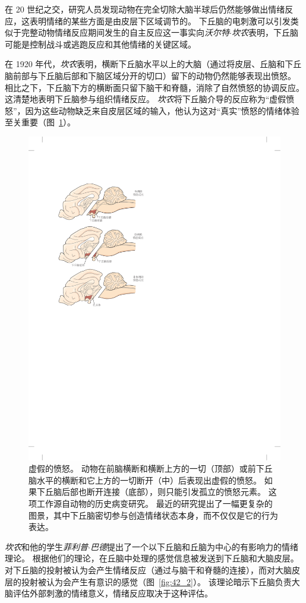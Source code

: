 在 20 世纪之交，研究人员发现动物在完全切除大脑半球后仍然能够做出情绪反应，这表明情绪的某些方面是由皮层下区域调节的。
下丘脑的电刺激可以引发类似于完整动物情绪反应期间发生的自主反应这一事实向\textit{沃尔特$\cdot$坎农}表明，下丘脑可能是控制战斗或逃跑反应和其他情绪的关键区域。


在 1920 年代，\textit{坎农}表明，横断下丘脑水平以上的大脑（通过将皮层、丘脑和下丘脑前部与下丘脑后部和下脑区域分开的切口）留下的动物仍然能够表现出愤怒。
相比之下，下丘脑下方的横断面只留下脑干和脊髓，消除了自然愤怒的协调反应。
这清楚地表明下丘脑参与组织情绪反应。
\textit{坎农}将下丘脑介导的反应称为“虚假愤怒”，因为这些动物缺乏来自皮层区域的输入，他认为这对“真实”愤怒的情绪体验至关重要（图~\ref{fig:42_3}）。


\begin{figure}[htbp]
	\centering
	\includegraphics[width=0.6\linewidth]{chap42/fig_42_3}
	\caption{虚假的愤怒。
		动物在前脑横断和横断上方的一切（顶部）或前下丘脑水平的横断和它上方的一切断开（中）后表现出虚假的愤怒。
		如果下丘脑后部也断开连接（底部），则只能引发孤立的愤怒元素。
		这项工作源自动物的历史病变研究。
		最近的研究提出了一幅更复杂的图景，其中下丘脑密切参与创造情绪状态本身，而不仅仅是它的行为表达。}
	\label{fig:42_3}
\end{figure}


\textit{坎农}和他的学生\textit{菲利普$\cdot$巴德}提出了一个以下丘脑和丘脑为中心的有影响力的情绪理论。
根据他们的理论，在丘脑中处理的感觉信息被发送到下丘脑和大脑皮层。
对下丘脑的投射被认为会产生情绪反应（通过与脑干和脊髓的连接），而对大脑皮层的投射被认为会产生有意识的感觉（图~\ref{fig:42_2}）。
该理论暗示下丘脑负责大脑评估外部刺激的情绪意义，情绪反应取决于这种评估。


